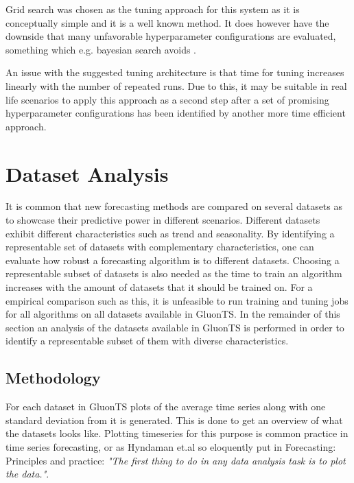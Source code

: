Grid search was chosen as the tuning approach for this system as it is conceptually simple and it is a well known method. It does however have the downside that many unfavorable hyperparameter configurations are evaluated, something which e.g. bayesian search avoids \cite{snoek2012practical}.

An issue with the suggested tuning architecture is that time for tuning increases linearly with the number of repeated runs. Due to this, it may be suitable in real life scenarios to apply this approach as a second step after a set of promising hyperparameter configurations has been identified by another more time efficient approach.

\section{Dataset Analysis}
\label{sec:dataset_analysis}
It is common that new forecasting methods are compared on several datasets as to showcase their predictive power in different scenarios. Different datasets exhibit different characteristics such as trend and seasonality. By identifying a representable set of datasets with complementary characteristics, one can evaluate how robust a forecasting algorithm is to different datasets. Choosing a representable subset of datasets is also needed as the time to train an algorithm increases with the amount of datasets that it should be trained on. For a empirical comparison such as this, it is unfeasible to run training and tuning jobs for all algorithms on all datasets available in GluonTS. In the remainder of this section an analysis of the datasets available in GluonTS is performed in order to identify a representable subset of them with diverse characteristics.

\subsection{Methodology}

For each dataset in GluonTS plots of the average time series along with one standard deviation from it is generated. This is done to get an overview of what the datasets looks like. Plotting timeseries for this purpose is common practice in time series forecasting, or as Hyndaman et.al so eloquently put in Forecasting: Principles and practice: \textit{"The first thing to do in any data analysis task is to plot the data."}.\cite{hyndman_forecasting_3rd}

